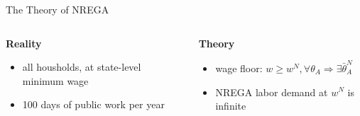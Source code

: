     \begin{frame}{The Theory of NREGA}
        \begin{columns}[T]
            \begin{column}{0.4\textwidth}
                \begin{block}{\small \centering \textbf{Reality}}
                \small
                \begin{itemize}
                    \item<2-> all housholds, at state-level minimum wage
                    \item<3-> 100 days of public work per year 
                \end{itemize}
                \end{block}
            \end{column}
        
            \begin{column}{0.4\textwidth}
                \begin{block}{\small \centering \textbf{Theory}}
                \small
                \begin{itemize}
                    \item<2-> wage floor: $w\geq w^N,\forall \theta_A\Rightarrow \exists\bar{\theta}^N_A$
                    \item<3-> NREGA labor demand at $w^N$ is infinite
                \end{itemize}
                \end{block}
                
            \end{column}
        \end{columns}

    \end{frame}

